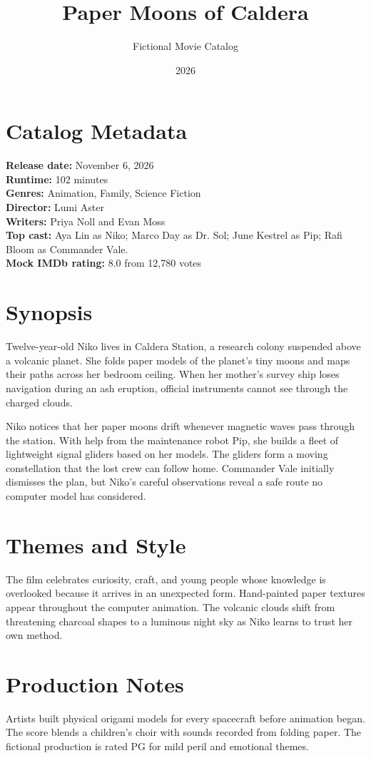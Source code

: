 \documentclass[11pt]{article}
\title{Paper Moons of Caldera}
\author{Fictional Movie Catalog}
\date{2026}
\begin{document}
\maketitle

\section*{Catalog Metadata}
\textbf{Release date:} November 6, 2026\\
\textbf{Runtime:} 102 minutes\\
\textbf{Genres:} Animation, Family, Science Fiction\\
\textbf{Director:} Lumi Aster\\
\textbf{Writers:} Priya Noll and Evan Moss\\
\textbf{Top cast:} Aya Lin as Niko; Marco Day as Dr. Sol; June Kestrel as Pip;
Rafi Bloom as Commander Vale.\\
\textbf{Mock IMDb rating:} 8.0 from 12,780 votes

\section*{Synopsis}
Twelve-year-old Niko lives in Caldera Station, a research colony suspended
above a volcanic planet. She folds paper models of the planet's tiny moons and
maps their paths across her bedroom ceiling. When her mother's survey ship
loses navigation during an ash eruption, official instruments cannot see
through the charged clouds.

Niko notices that her paper moons drift whenever magnetic waves pass through
the station. With help from the maintenance robot Pip, she builds a fleet of
lightweight signal gliders based on her models. The gliders form a moving
constellation that the lost crew can follow home. Commander Vale initially
dismisses the plan, but Niko's careful observations reveal a safe route no
computer model has considered.

\section*{Themes and Style}
The film celebrates curiosity, craft, and young people whose knowledge is
overlooked because it arrives in an unexpected form. Hand-painted paper
textures appear throughout the computer animation. The volcanic clouds shift
from threatening charcoal shapes to a luminous night sky as Niko learns to
trust her own method.

\section*{Production Notes}
Artists built physical origami models for every spacecraft before animation
began. The score blends a children's choir with sounds recorded from folding
paper. The fictional production is rated PG for mild peril and emotional
themes.
\end{document}
